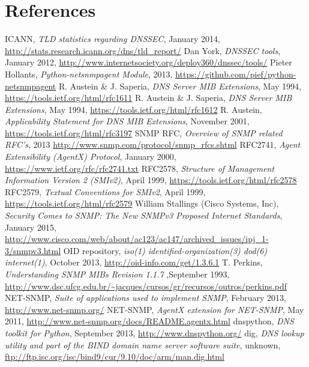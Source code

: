 \section*{References}
\label{chap:references}
\begin{thebibliography}{99}
 ICANN, {\em TLD statistics regarding DNSSEC}, January 2014, \url{http://stats.research.icann.org/dns/tld_report/}
 Dan York, {\em DNSSEC tools}, January 2012, \url{http://www.internetsociety.org/deploy360/dnssec/tools/}
 Pieter Hollants, {\em Python-netsnmpagent Module}, 2013, \url{https://github.com/pief/python-netsnmpagent}
 R. Austein \& J. Saperia, {\em DNS Server MIB Extensions}, May 1994, \url{https://tools.ietf.org/html/rfc1611}
 R. Austein \& J. Saperia, {\em DNS Server MIB Extensions}, May 1994, \url{https://tools.ietf.org/html/rfc1612}
 R. Austein, {\em Applicability Statement for DNS MIB Extensions}, November 2001, \url{https://tools.ietf.org/html/rfc3197}
 SNMP RFC, {\em Overview of SNMP related RFC's}, 2013 \url{http://www.snmp.com/protocol/snmp_rfcs.shtml} 
 RFC2741,  {\em Agent Extensibility (AgentX) Protocol}, January 2000, \url{https://www.ietf.org/rfc/rfc2741.txt}
 RFC2578, {\em Structure of Management Information Version 2 (SMIv2)}, April 1999, \url{https://tools.ietf.org/html/rfc2578}
 RFC2579, {\em Textual Conventions for SMIv2}, April 1999, \url{https://tools.ietf.org/html/rfc2579}
 William Stallings (Cisco Systems, Inc), {\em Security Comes to SNMP: The New SNMPv3 Proposed Internet Standards}, January  2015, \url{http://www.cisco.com/web/about/ac123/ac147/archived_issues/ipj_1-3/snmpv3.html}
 OID repository, {\em iso(1) identified-organization(3) dod(6) internet(1)}, October 2013, \url{http://oid-info.com/get/1.3.6.1}
 T. Perkins, {\em Understanding SNMP MIBs Revision 1.1.7 },September 1993, \url{http://www.dsc.ufcg.edu.br/~jacques/cursos/gr/recursos/outros/perkins.pdf}
 NET-SNMP, {\em Suite of applications used to implement SNMP}, February 2013, \url{http://www.net-snmp.org/}
 NET-SNMP, {\em AgentX extension for NET-SNMP}, May 2011, \url{http://www.net-snmp.org/docs/README.agentx.html}
 dnspython, {\em DNS toolkit for Python}, September 2013, \url{http://www.dnspython.org/}
 dig, {\em DNS lookup utility and part of the BIND domain name server software suite}, unknown, \url{ftp://ftp.isc.org/isc/bind9/cur/9.10/doc/arm/man.dig.html}

\end{thebibliography}

